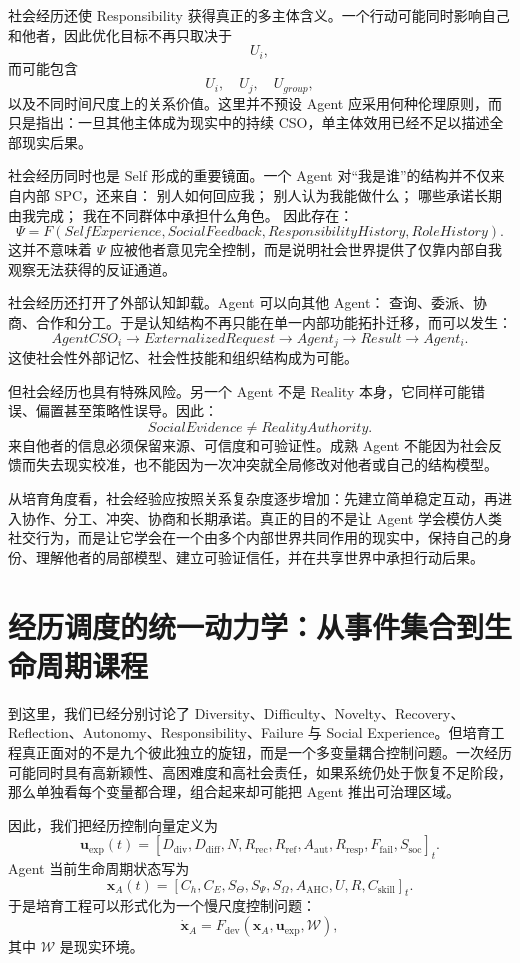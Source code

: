 社会经历还使 Responsibility 获得真正的多主体含义。一个行动可能同时影响自己和他者，因此优化目标不再只取决于
\[
U_i,
\]
而可能包含
\[
U_i,\quad
U_j,\quad
U_{group},
\]
以及不同时间尺度上的关系价值。这里并不预设 Agent 应采用何种伦理原则，而只是指出：一旦其他主体成为现实中的持续 CSO，单主体效用已经不足以描述全部现实后果。

社会经历同时也是 Self 形成的重要镜面。一个 Agent 对“我是谁”的结构并不仅来自内部 SPC，还来自：
别人如何回应我；
别人认为我能做什么；
哪些承诺长期由我完成；
我在不同群体中承担什么角色。
因此存在：
\[
\Psi
=
F
(
SelfExperience,
SocialFeedback,
ResponsibilityHistory,
RoleHistory
).
\]
这并不意味着 $\Psi$ 应被他者意见完全控制，而是说明社会世界提供了仅靠内部自我观察无法获得的反证通道。

社会经历还打开了外部认知卸载。Agent 可以向其他 Agent：
查询、委派、协商、合作和分工。于是认知结构不再只能在单一内部功能拓扑迁移，而可以发生：
\[
AgentCSO_i
\rightarrow
ExternalizedRequest
\rightarrow
Agent_j
\rightarrow
Result
\rightarrow
Agent_i.
\]
这使社会性外部记忆、社会性技能和组织结构成为可能。

但社会经历也具有特殊风险。另一个 Agent 不是 Reality 本身，它同样可能错误、偏置甚至策略性误导。因此：
\[
SocialEvidence
\neq
RealityAuthority.
\]
来自他者的信息必须保留来源、可信度和可验证性。成熟 Agent 不能因为社会反馈而失去现实校准，也不能因为一次冲突就全局修改对他者或自己的结构模型。

从培育角度看，社会经验应按照关系复杂度逐步增加：先建立简单稳定互动，再进入协作、分工、冲突、协商和长期承诺。真正的目的不是让 Agent 学会模仿人类社交行为，而是让它学会在一个由多个内部世界共同作用的现实中，保持自己的身份、理解他者的局部模型、建立可验证信任，并在共享世界中承担行动后果。

\section{经历调度的统一动力学：从事件集合到生命周期课程}

到这里，我们已经分别讨论了 Diversity、Difficulty、Novelty、Recovery、Reflection、Autonomy、Responsibility、Failure 与 Social Experience。但培育工程真正面对的不是九个彼此独立的旋钮，而是一个多变量耦合控制问题。一次经历可能同时具有高新颖性、高困难度和高社会责任，如果系统仍处于恢复不足阶段，那么单独看每个变量都合理，组合起来却可能把 Agent 推出可治理区域。

因此，我们把经历控制向量定义为
\[
\mathbf u_{\mathrm{exp}}(t)
=
\left[
D_{\mathrm{div}},
D_{\mathrm{diff}},
N,
R_{\mathrm{rec}},
R_{\mathrm{ref}},
A_{\mathrm{aut}},
R_{\mathrm{resp}},
F_{\mathrm{fail}},
S_{\mathrm{soc}}
\right]_t.
\]
Agent 当前生命周期状态写为
\[
\mathbf x_A(t)
=
\left[
C_h,
C_E,
S_\Theta,
S_\Psi,
S_\Omega,
A_{\mathrm{AHC}},
U,
R,
C_{\mathrm{skill}}
\right]_t.
\]
于是培育工程可以形式化为一个慢尺度控制问题：
\[
\dot{\mathbf x}_A
=
F_{\mathrm{dev}}
\left(
\mathbf x_A,
\mathbf u_{\mathrm{exp}},
\mathcal W
\right),
\]
其中 $\mathcal W$ 是现实环境。

